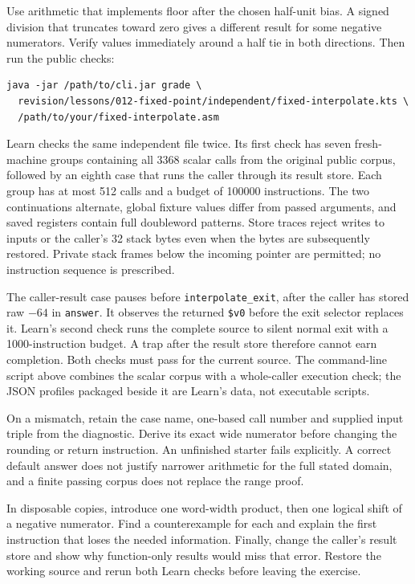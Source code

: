 Use arithmetic that implements floor after the chosen half-unit bias. A signed
division that truncates toward zero gives a different result for some negative
numerators. Verify values immediately around a half tie in both directions.
Then run the public checks:
\begin{verbatim}
java -jar /path/to/cli.jar grade \
  revision/lessons/012-fixed-point/independent/fixed-interpolate.kts \
  /path/to/your/fixed-interpolate.asm
\end{verbatim}
Learn checks the same independent file twice. Its first check has seven
fresh-machine groups containing all 3368 scalar calls from the original public
corpus, followed by an eighth case that runs the caller through its result
store. Each group has at most 512 calls and a budget of 100000 instructions.
The two continuations alternate, global fixture values differ from passed
arguments, and saved registers contain full doubleword patterns. Store traces
reject writes to inputs or the caller's 32 stack bytes even when the bytes are
subsequently restored. Private stack frames below the incoming pointer are
permitted; no instruction sequence is prescribed.

The caller-result case pauses before \texttt{interpolate\_exit}, after the
caller has stored raw $-64$ in \texttt{answer}. It observes the returned
\texttt{\$v0} before the exit selector replaces it. Learn's second check runs
the complete source to silent normal exit with a 1000-instruction budget.
A trap after the result store therefore cannot earn completion. Both checks
must pass for the current source. The command-line script above combines the
scalar corpus with a whole-caller execution check; the JSON profiles packaged
beside it are Learn's data, not executable scripts.

On a mismatch, retain the case name, one-based call number and supplied input
triple from the diagnostic. Derive its exact wide numerator before changing
the rounding or return instruction. An unfinished starter fails explicitly.
A correct default answer does not justify narrower arithmetic for the full
stated domain, and a finite passing corpus does not replace the range proof.

In disposable copies, introduce one word-width product, then one logical shift
of a negative numerator. Find a counterexample for each and explain the first
instruction that loses the needed information. Finally, change the caller's
result store and show why function-only results would miss that error. Restore
the working source and rerun both Learn checks before leaving the exercise.
